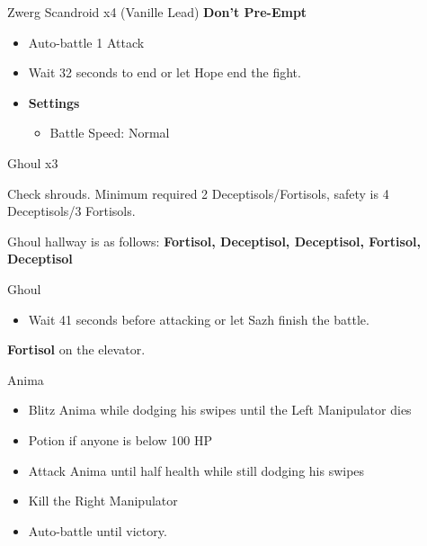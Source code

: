 \begin{multicols}{2}
  \begin{battle}[0:32]{Zwerg Scandroid x4 (Vanille Lead) \textbf{Don't Pre-Empt}}
    \begin{itemize}
      \item Auto-battle 1 Attack
      \item Wait 32 seconds to end or let Hope end the fight.
    \end{itemize}
  \end{battle}

  \begin{menu}
    \begin{itemize}
      \item \textbf{Settings}
            \begin{itemize}
              \item Battle Speed: Normal
            \end{itemize}
    \end{itemize}
  \end{menu}

  \begin{battle}[0:12]{Ghoul x3}
  \end{battle}

  Check shrouds. Minimum required 2 Deceptisols/Fortisols, safety is 4 Deceptisols/3 Fortisols.

  Ghoul hallway is as follows: {\bf Fortisol, Deceptisol, Deceptisol, Fortisol, Deceptisol}

  \begin{battle}[0:41]{Ghoul}
    \begin{itemize}
      \item Wait 41 seconds before attacking or let Sazh finish the battle.
    \end{itemize}
  \end{battle}

  \textbf{Fortisol} on the elevator.

  \begin{battle}[0:54]{Anima}

    \begin{itemize}
      \item Blitz Anima while dodging his swipes until the Left Manipulator dies
      \item Potion if anyone is below 100 HP
      \item Attack Anima until half health while still dodging his swipes
      \item Kill the Right Manipulator
      \item Auto-battle until victory.
    \end{itemize}
  \end{battle}



\end{multicols}
